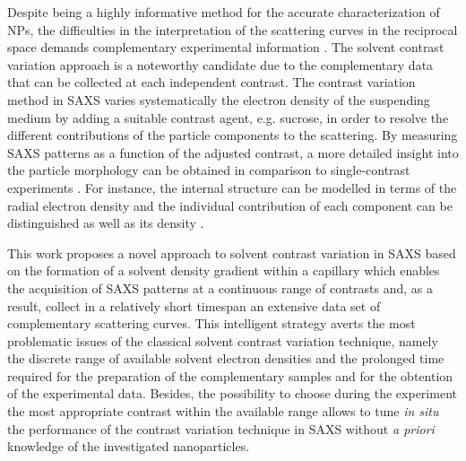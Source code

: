 Despite being a highly informative method for the accurate characterization of NPs, the difficulties in the interpretation of the scattering curves in the reciprocal space demands complementary experimental information \citep{mykhaylyk_structural_2012}. The solvent contrast variation approach is a noteworthy candidate due to the complementary data that can be collected at each independent contrast. The contrast variation method in SAXS varies systematically the electron density of the suspending medium by adding a suitable contrast agent, e.g. sucrose, in order to resolve the different contributions of the particle components to the scattering. By measuring SAXS patterns as a function of the adjusted contrast, a more detailed insight into the particle morphology can be obtained in comparison to single-contrast experiments \citep{bolze_situ_2004}. For instance, the internal structure can be modelled in terms of the radial electron density \citep{dingenouts_radial_1994,dingenouts_analysis_1999,ballauff_analysis_2011,ballauff_small-angle_1996} and the individual contribution of each component can be distinguished \citep{beyer_saxs_1990,grunder_analysis_1991,grunder_small-angle_1993,ottewill_characterization_1995,bolze_small-angle_1997,dingenouts_structure_1994} as well as its density \citep{mykhaylyk_application_2007}.

This work proposes a novel approach to solvent contrast variation in SAXS based on the formation of a solvent density gradient within a capillary which enables the acquisition of SAXS patterns at a continuous range of contrasts and, as a result, collect in a relatively short timespan an extensive data set of complementary scattering curves. This intelligent strategy averts the most problematic issues of the classical solvent contrast variation technique, namely the discrete range of available solvent electron densities and the prolonged time required for the preparation of the complementary samples and for the obtention of the experimental data. Besides, the possibility to choose during the experiment the most appropriate contrast within the available range allows to tune \emph{in situ} the performance of the contrast variation technique in SAXS without \emph{a priori} knowledge of the investigated nanoparticles.

